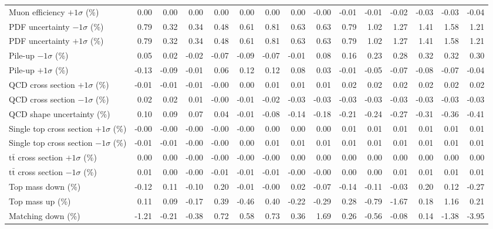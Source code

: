 \begin{table}[htbp]
{\begin{tabular}{lrrrrrrrrrrrrrr}
Muon efficiency $+1\sigma$ (\%) & 0.00 & 0.00 & 0.00 & 0.00 & 0.00 & 0.00 & 0.00 & -0.00 & -0.01 & -0.01 & -0.02 & -0.03 & -0.03 & -0.04 \\ 
PDF uncertainty $-1\sigma$ (\%) & 0.79 & 0.32 & 0.34 & 0.48 & 0.61 & 0.81 & 0.63 & 0.63 & 0.79 & 1.02 & 1.27 & 1.41 & 1.58 & 1.21 \\ 
PDF uncertainty $+1\sigma$ (\%) & 0.79 & 0.32 & 0.34 & 0.48 & 0.61 & 0.81 & 0.63 & 0.63 & 0.79 & 1.02 & 1.27 & 1.41 & 1.58 & 1.21 \\ 
Pile-up $-1\sigma$ (\%) & 0.05 & 0.02 & -0.02 & -0.07 & -0.09 & -0.07 & -0.01 & 0.08 & 0.16 & 0.23 & 0.28 & 0.32 & 0.32 & 0.30 \\ 
Pile-up $+1\sigma$ (\%) & -0.13 & -0.09 & -0.01 & 0.06 & 0.12 & 0.12 & 0.08 & 0.03 & -0.01 & -0.05 & -0.07 & -0.08 & -0.07 & -0.04 \\ 
QCD cross section \ensuremath{+1\sigma} (\%) & -0.01 & -0.01 & -0.01 & -0.00 & 0.00 & 0.01 & 0.01 & 0.01 & 0.02 & 0.02 & 0.02 & 0.02 & 0.02 & 0.02 \\ 
QCD cross section \ensuremath{-1\sigma} (\%) & 0.02 & 0.02 & 0.01 & -0.00 & -0.01 & -0.02 & -0.03 & -0.03 & -0.03 & -0.03 & -0.03 & -0.03 & -0.03 & -0.03 \\ 
QCD shape uncertainty (\%) & 0.10 & 0.09 & 0.07 & 0.04 & -0.01 & -0.08 & -0.14 & -0.18 & -0.21 & -0.24 & -0.27 & -0.31 & -0.36 & -0.41 \\ 
Single top cross section $+1\sigma$ (\%) & -0.00 & -0.00 & -0.00 & -0.00 & -0.00 & 0.00 & 0.00 & 0.00 & 0.01 & 0.01 & 0.01 & 0.01 & 0.01 & 0.01 \\ 
Single top cross section $-1\sigma$ (\%) & -0.01 & -0.01 & -0.00 & -0.00 & 0.00 & 0.01 & 0.01 & 0.01 & 0.01 & 0.01 & 0.01 & 0.01 & 0.01 & 0.01 \\ 
$\mathrm{t}\bar{\mathrm{t}}$ cross section $+1\sigma$ (\%) & 0.00 & 0.00 & -0.00 & -0.00 & -0.00 & -0.00 & 0.00 & 0.00 & 0.00 & 0.00 & 0.00 & 0.00 & 0.00 & 0.00 \\ 
$\mathrm{t}\bar{\mathrm{t}}$ cross section $-1\sigma$ (\%) & 0.01 & 0.00 & -0.00 & -0.01 & -0.01 & -0.01 & -0.00 & -0.00 & 0.00 & 0.00 & 0.01 & 0.01 & 0.01 & 0.01 \\ 
Top mass down (\%) & -0.12 & 0.11 & -0.10 & 0.20 & -0.01 & -0.00 & 0.02 & -0.07 & -0.14 & -0.11 & -0.03 & 0.20 & 0.12 & -0.27 \\ 
Top mass up (\%) & 0.11 & 0.09 & -0.17 & 0.39 & -0.46 & 0.40 & -0.22 & -0.29 & 0.28 & -0.79 & -1.67 & 0.18 & 1.16 & 0.21 \\ 
Matching down (\%) & -1.21 & -0.21 & -0.38 & 0.72 & 0.58 & 0.73 & 0.36 & 1.69 & 0.26 & -0.56 & -0.08 & 0.14 & -1.38 & -3.95 \\ 

\end{tabular}}
\end{table}
